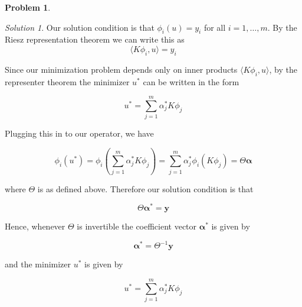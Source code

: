 \documentclass[12pt,a4paper]{article}
\theoremstyle{definition}
\newtheorem{problem}{Problem}
\theoremstyle{remark}
\newtheorem*{solution}{Solution}
\begin{document}
\begin{problem}
\begin{enumerate}[(a)]
    \begin{solution}
        Our solution condition is that $\phi_i(u) = y_i$ for all $i = 1, \dots, m$. By the Riesz representation theorem we can write this as $$\langle K \phi_i, u \rangle = y_i$$

        Since our minimization problem depends only on inner products $\langle K \phi_i , u \rangle$, by the representer theorem the minimizer $u^*$ can be written in the form 

        $$u^* = \sum_{j=1}^m \alpha_j^* K \phi_j$$

        Plugging this in to our operator, we have 

        $$\phi_i(u^*) = \phi_i\left( \sum_{j=1}^m \alpha_j^* K \phi_j \right) = \sum_{j=1}^m \alpha_j^* \phi_i (K \phi_j) = \Theta \boldsymbol \alpha$$

        where $\Theta$ is as defined above. Therefore our solution condition is that 

        $$\Theta \boldsymbol{\alpha}^* = \mathbf y$$

        Hence, whenever $\Theta$ is invertible the coefficient vector $\boldsymbol \alpha^*$ is given by 
        
        $$\boldsymbol \alpha^* = \Theta^{-1} \mathbf y$$

        and the minimizer $u^*$ is given by 

        $$u^* = \sum_{j=1}^m \alpha_j^* K \phi_j$$
    \end{solution}
\end{enumerate}
\end{problem}
\end{document}
